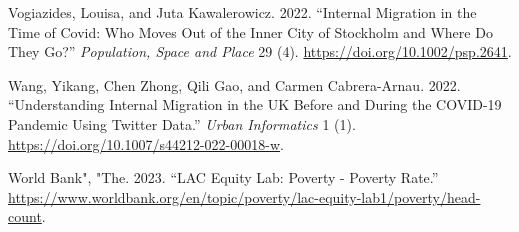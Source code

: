 \documentclass[11pt,letterpaper]{article}
\newlength{\cslhangindent}
\newlength{\cslentryspacingunit} %
\newenvironment{CSLReferences}[2] %
 {%
  \setlength{\parindent}{0pt}
  \ifodd #1
  \let\oldpar\par
  \def\par{\hangindent=\cslhangindent\oldpar}
  \fi
  \setlength{\parskip}{#2\cslentryspacingunit}
 }%
 {}
\begin{document}
\begin{CSLReferences}{1}{0}
\leavevmode{}%
Vogiazides, Louisa, and Juta Kawalerowicz. 2022. {``Internal Migration
in the Time of Covid: Who Moves Out of the Inner City of Stockholm and
Where Do They Go?''} \emph{Population, Space and Place} 29 (4).
\url{https://doi.org/10.1002/psp.2641}.

\leavevmode{}%
Wang, Yikang, Chen Zhong, Qili Gao, and Carmen Cabrera-Arnau. 2022.
{``Understanding Internal Migration in the UK Before and During the
COVID-19 Pandemic Using Twitter Data.''} \emph{Urban Informatics} 1 (1).
\url{https://doi.org/10.1007/s44212-022-00018-w}.

\leavevmode{}%
World Bank", "The. 2023. {``LAC Equity Lab: Poverty - Poverty Rate.''}
\url{https://www.worldbank.org/en/topic/poverty/lac-equity-lab1/poverty/head-count}.

\end{CSLReferences}




\setlength{\bibsep}{0.00cm plus 0.05cm} %


\end{document}
